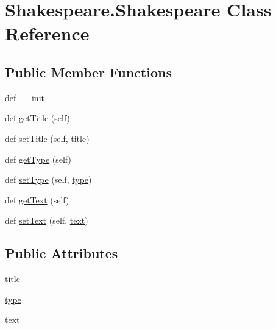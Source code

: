 \hypertarget{class_shakespeare_1_1_shakespeare}{}\section{Shakespeare.\+Shakespeare Class Reference}
\label{class_shakespeare_1_1_shakespeare}
\subsection*{Public Member Functions}
\begin{DoxyCompactItemize}
\item 
def \hyperlink{class_shakespeare_1_1_shakespeare_ad4f34d647eb0cb78dec79a5632da979c}{\+\_\+\+\_\+init\+\_\+\+\_\+}
\item 
def \hyperlink{class_shakespeare_1_1_shakespeare_ad7fb6f9256e1a910e52cfed7f8e536bd}{get\+Title} (self)
\item 
def \hyperlink{class_shakespeare_1_1_shakespeare_ae4e450706b5953d10af086f2c3774616}{set\+Title} (self, \hyperlink{class_shakespeare_1_1_shakespeare_aef37764e9701d6af1a3832dd8952924a}{title})
\item 
def \hyperlink{class_shakespeare_1_1_shakespeare_a9f4afbdc4d5041e4b8ccec267d6e6c57}{get\+Type} (self)
\item 
def \hyperlink{class_shakespeare_1_1_shakespeare_af75f2d52ad8d560e915a1b753c287c2d}{set\+Type} (self, \hyperlink{class_shakespeare_1_1_shakespeare_a64b6e8d689d6afe43fc672dbe07a23bc}{type})
\item 
def \hyperlink{class_shakespeare_1_1_shakespeare_a26da0cc7345fce4f5412a99bfc5d67f3}{get\+Text} (self)
\item 
def \hyperlink{class_shakespeare_1_1_shakespeare_a9bf6adbbeae45076f0ac43bd3e1aa8f1}{set\+Text} (self, \hyperlink{class_shakespeare_1_1_shakespeare_af0397a2f6468faccf49a1bfc63c921f5}{text})
\end{DoxyCompactItemize}
\subsection*{Public Attributes}
\begin{DoxyCompactItemize}
\item 
\hyperlink{class_shakespeare_1_1_shakespeare_aef37764e9701d6af1a3832dd8952924a}{title}
\item 
\hyperlink{class_shakespeare_1_1_shakespeare_a64b6e8d689d6afe43fc672dbe07a23bc}{type}
\item 
\hyperlink{class_shakespeare_1_1_shakespeare_af0397a2f6468faccf49a1bfc63c921f5}{text}
\end{DoxyCompactItemize}


